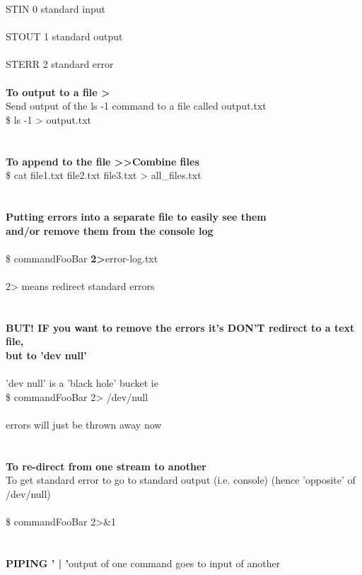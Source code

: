 \documentclass[10pt,a4paper]{article}
\begin{document}
{\Large STIN  0			standard input\\
\\
STOUT 1			standard output\\
\\
STERR 2			standard error\\
\\
}\textbf{{\Large To output to a file >}}{\Large \\
Send output of the ls -1 command to a file called output.txt\\
\$ ls -1 > output.txt        \\
\\
\\
\textbf{To append to the file >>}}{\Large \textbf{Combine files }}{\Large \\
\$ cat file1.txt file2.txt file3.txt > all\_files.txt\\
\\
\\
\textbf{Putting errors into a separate file to easily see them \\
and/or remove them from the console log}}{\Large \\
\\
\$ commandFooBar \textbf{2>}}{\Large  error-log.txt\\
\\
2>  means redirect standard errors\\
\\
\\
\textbf{BUT! IF you want to remove the errors it's DON'T redirect to a text file, \\
but to 'dev null'}}{\Large \\
\\
'dev null' is a 'black hole' bucket ie \\
\$ commandFooBar 2> /dev/null}{\Large \\
\\
errors will just be thrown away now\\
\\
\\
\textbf{To re-direct from one stream to another}}{\Large \\
To get standard error to go to standard output (i.e. console) (hence 'opposite' of /dev/null}{\Large  )\\
\\
\$ commandFooBar 2>\&1 \\
\\
\\
\textbf{PIPING ' | '}}{\Large     output of one command goes to input of another\\
}
\end{document}
